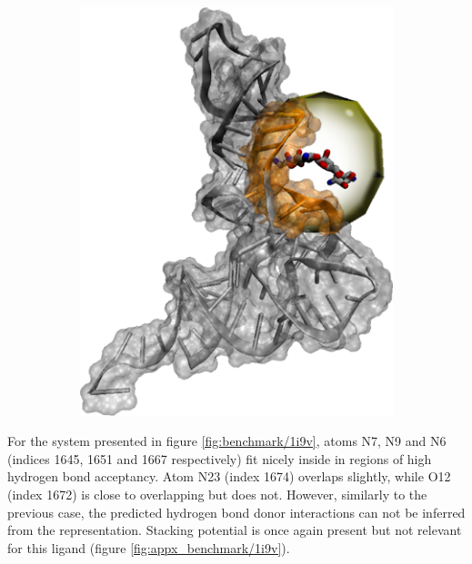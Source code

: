       \begin{figure}[H] \centering
        \begin{subfigure}[c]{0.3\textwidth} \centering
          \includegraphics[width=1\textwidth]{figures/results/ps_rna/1i9v.png}
        \end{subfigure}
        \begin{subfigure}[c]{0.3\textwidth} \centering
        \end{subfigure}
      \end{figure}

      For the system presented in figure \ref{fig:benchmark/1i9v}, atoms N7, N9 and N6 (indices 1645, 1651 and 1667 respectively) fit nicely inside in regions of high hydrogen bond acceptancy. Atom N23 (index 1674) overlaps slightly, while O12 (index 1672) is close to overlapping but does not. However, similarly to the previous case, the predicted hydrogen bond donor interactions can not be inferred from the representation. Stacking potential is once again present but not relevant for this ligand (figure \ref{fig:appx_benchmark/1i9v}).

